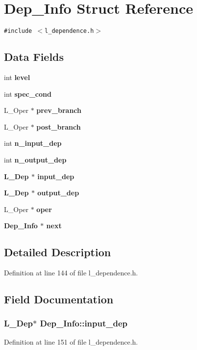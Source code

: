 \section{Dep\_\-Info Struct Reference}
\label{structDep__Info}
{\tt \#include $<$l\_\-dependence.h$>$}

\subsection*{Data Fields}
\begin{CompactItemize}
\item 
int \bf{level}
\item 
int \bf{spec\_\-cond}
\item 
L\_\-Oper $\ast$ \bf{prev\_\-branch}
\item 
L\_\-Oper $\ast$ \bf{post\_\-branch}
\item 
int \bf{n\_\-input\_\-dep}
\item 
int \bf{n\_\-output\_\-dep}
\item 
\bf{L\_\-Dep} $\ast$ \bf{input\_\-dep}
\item 
\bf{L\_\-Dep} $\ast$ \bf{output\_\-dep}
\item 
L\_\-Oper $\ast$ \bf{oper}
\item 
\bf{Dep\_\-Info} $\ast$ \bf{next}
\end{CompactItemize}


\subsection{Detailed Description}




Definition at line 144 of file l\_\-dependence.h.

\subsection{Field Documentation}
\subsubsection{\setlength{\rightskip}{0pt plus 5cm}\bf{L\_\-Dep}$\ast$ \bf{Dep\_\-Info::input\_\-dep}}\label{structDep__Info_b034c3f32696bf3bb7cb6802bd4a445e}




Definition at line 151 of file l\_\-dependence.h.

